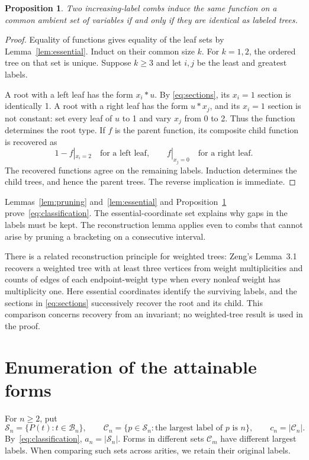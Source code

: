 \documentclass[11pt]{amsart}
\newtheorem{proposition}[theorem]{Proposition}
\newcommand{\B}{\mathcal{B}}
\newcommand{\Sset}{\mathcal{S}}
\newcommand{\Cset}{\mathcal{C}}
\begin{document}
\begin{proposition}\label{prop:separation}
Two increasing-label combs induce the same function on a common ambient
set of variables if and only if they are identical as labeled trees.
\end{proposition}
\begin{proof}
Equality of functions gives equality of the leaf sets by
Lemma~\ref{lem:essential}. Induct on their common size \(k\). For
\(k=1,2\), the ordered tree on that set is unique. Suppose \(k\geq3\)
and let \(i,j\) be the least and greatest labels.

A root with a left leaf has the form \(x_i*u\). By
\eqref{eq:sections}, its \(x_i=1\) section is identically 1.
A root with a right leaf has the form \(u*x_j\), and its \(x_i=1\)
section is not constant: set every leaf of \(u\) to 1 and vary
\(x_j\) from 0 to 2. Thus the function determines the root type.
If \(f\) is the parent function, its composite child function is
recovered as
\[
 1-f|_{x_i=2}\quad\text{for a left leaf},\qquad
 f|_{x_j=0}\quad\text{for a right leaf}.
\]
The recovered functions agree on the remaining labels. Induction
determines the child trees, and hence the parent trees. The reverse
implication is immediate.
\end{proof}

Lemmas~\ref{lem:pruning} and~\ref{lem:essential} and
Proposition~\ref{prop:separation} prove~\eqref{eq:classification}.
The essential-coordinate set explains why gaps in the labels must be kept.
The reconstruction lemma applies even to combs that cannot arise by pruning
a bracketing on a consecutive interval.

There is a related reconstruction principle for weighted trees:
Zeng's Lemma~3.1~\cite{Zeng2026MultiplicityArxiv} recovers a weighted tree
with at least three vertices from weight multiplicities and counts of edges of each endpoint-weight
type when every nonleaf weight has multiplicity one. Here essential
coordinates identify the surviving labels, and the sections in
\eqref{eq:sections} successively recover the root and its child.
This comparison concerns recovery from an invariant; no weighted-tree
result is used in the proof.

\section{Enumeration of the attainable forms}

For \(n\geq2\), put
\[
 \Sset_n=\{P(t):t\in\B_n\},\qquad
 \Cset_n=\{p\in\Sset_n:\text{the largest label of }p\text{ is }n\},
 \qquad c_n=|\Cset_n|.
\]
By~\eqref{eq:classification}, \(a_n=|\Sset_n|\). Forms in different
sets \(\Cset_m\) have different largest labels. When comparing such
sets across arities, we retain their original labels.
\end{document}
